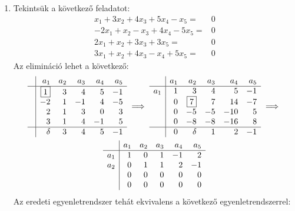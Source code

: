 \documentclass[9pt, a4paper, showtrims]{memoir}
\theoremstyle{plain}
\theoremstyle{remark}
\theoremstyle{definition}
\begin{document}
\begin{enumerate}
    \item
        Tekintsük a következő feladatot:
        \[
            \begin{array}{rl}
                x_1+3x_2+4x_3+5x_4-x_5=&0\\
                -2x_1+x_2-x_3+4x_4-5x_5=&0\\
                2x_1+x_2+3x_3+3x_5=&0\\
                3x_1+x_2+4x_3-x_4+5x_5=&0
            \end{array}
        \]
        Az elimináció lehet a következő:
        \begin{multline*}
            \begin{array}{r|rrrrr}
                &a_1&a_2&a_3&a_4&a_5\\
                \hline
                &\boxed{1}&3&4&5&-1\\
                &-2&1&-1&4&-5\\
                &2&1&3&0&3\\
                &3&1&4&-1&5\\
                \hline
                &\delta&3&4&5&-1
            \end{array}
            \implies
            \begin{array}{r|rrrrr}
                &a_1&a_2&a_3&a_4&a_5\\
                \hline
                a_1&1&3&4&5&-1\\
                &0&\boxed{7}&7&14&-7\\
                &0&-5&-5&-10&5\\
                &0&-8&-8&-16&8\\
                \hline
                &0&\delta&1&2&-1
            \end{array}
            \implies
            \\
            \begin{array}{r|rrrrr}
                &a_1&a_2&a_3&a_4&a_5\\
                \hline
                a_1&1&0&1&-1&2\\
                a_2&0&1&1&2&-1\\
                &0&0&0&0&0\\
                &0&0&0&0&0
            \end{array}
        \end{multline*}
        Az eredeti egyenletrendszer tehát ekvivalens a következő egyenletrendszerrel:
        \[
            \begin{array}{rl}

\end{array}\]
\end{enumerate}
\end{document}

